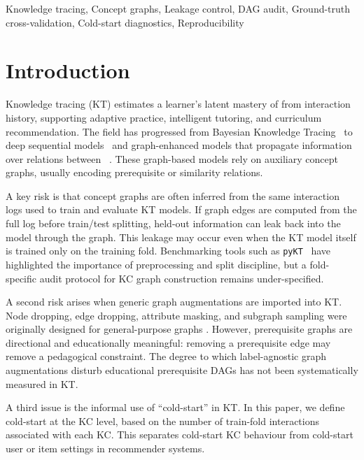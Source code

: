 \begin{IEEEkeywords}
Knowledge tracing,
Concept graphs,
Leakage control,
DAG audit,
Ground-truth cross-validation,
Cold-start diagnostics,
Reproducibility
\end{IEEEkeywords}
\section{Introduction}
\label{sec:intro}
Knowledge tracing (KT) estimates a learner's latent mastery of
\KCs{} from interaction history, supporting adaptive practice,
intelligent tutoring, and curriculum recommendation. The field has
progressed from Bayesian Knowledge Tracing~\cite{corbett1995bkt} to
deep sequential models~\cite{piech2015dkt,zhang2017dkvmn,ghosh2020akt,
liu2023simplekt} and graph-enhanced models that propagate information
over relations between \KCs{}~\cite{nakagawa2019gkt,tong2020skt,
yang2021gikt,dygkt2024,dgekt2024}. These graph-based models rely on
auxiliary concept graphs, usually encoding prerequisite or similarity
relations.

A key risk is that concept graphs are often inferred from the same
interaction logs used to train and evaluate KT models. If graph edges
are computed from the full log before train/test splitting, held-out
information can leak back into the model through the graph. This leakage
may occur even when the KT model itself is trained only on the training
fold. Benchmarking tools such as \texttt{pyKT}~\cite{liu2022pykt} have
highlighted the importance of preprocessing and split discipline, but a
fold-specific audit protocol for KC graph construction remains
under-specified.

A second risk arises when generic graph augmentations are imported into
KT. Node dropping, edge dropping, attribute masking, and subgraph
sampling were originally designed for general-purpose graphs
\cite{you2020graphcl,zhu2021gca,xia2022simgrace,thakoor2021bgrl}.
However, prerequisite graphs are directional and educationally
meaningful: removing a prerequisite edge may remove a pedagogical
constraint. The degree to which label-agnostic graph augmentations
disturb educational prerequisite DAGs has not been systematically
measured in KT.

A third issue is the informal use of ``cold-start'' in KT. In this
paper, we define cold-start at the KC level, based on the number of
train-fold interactions associated with each KC. This separates
cold-start KC behaviour from cold-start user or item settings in
recommender systems.

